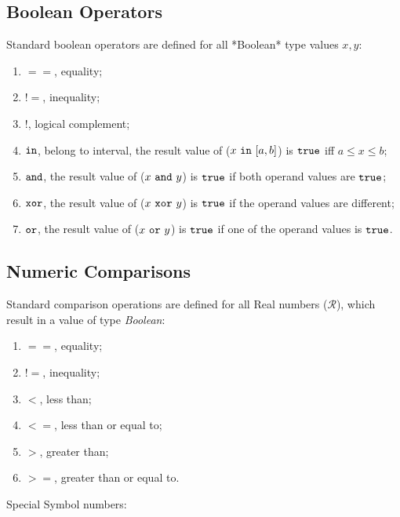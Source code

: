\documentclass{WileySix}
\begin{document}
\subsection{Boolean Operators}
Standard boolean operators are defined for all *Boolean* type values $x, y$:

\begin{enumerate}
\item $==$, equality;

\item $!=$,  inequality;

\item $!$, logical complement;

\item ${\tt in}$,  belong to interval, the result value of ($x~ {\tt in}~[a,b]$) is ${\tt true}$ iff $a \leq x \leq b$;

\item ${\tt and}$, the result value of ($x~{\tt and}~y$) is ${\tt true}$ if both operand values are ${\tt true}$;

\item ${\tt xor}$, the result value of ($x~{\tt xor}~y$) is ${\tt true}$ if the operand 
values are different;

\item ${\tt or}$, the result value of ($x~ {\tt or} ~y$) is ${\tt true}$ if one of the operand values is ${\tt true}$.
\end{enumerate}



\subsection{Numeric Comparisons}
 Standard comparison operations are defined for all Real numbers ($\mathcal{R}$), which result in a value of type {\em Boolean}:

\begin{enumerate}
\item $==$,   equality;
\item $!=$,   inequality;
\item $<$,   less than;
\item $<=$,   less than or equal to;
\item $>$,   greater than;
\item $>=$,   greater than or equal to.
\end{enumerate}






Special Symbol numbers:
\end{document}

